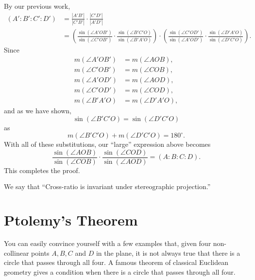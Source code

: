 \documentclass{ximera}
\begin{document}
\begin{problem}
\begin{freeResponse}
By our previous work, 
\begin{align*}
(A':B':C':D') &=\frac{|A'B'|}{|C'B'|}\cdot\frac{|C'D'|}{|A'D'|}\\
&=\left(\frac{\sin(\angle A'OB')}{\sin(\angle C'OB')}\cdot 
\frac{
\sin(\angle B'C'O)
}{
\sin(\angle B'A'O)
}\right) 
\cdot\left(\frac{
\sin(\angle C'OD')
}{
\sin(\angle A'OD')
}\cdot\frac{\sin(\angle D'A'O)}{\sin(\angle D'C'O)}\right).
\end{align*}
Since 
\begin{align*}
m(\angle A'OB') &= m(\angle AOB),\\
m(\angle C'OB') &= m(\angle COB),\\
m(\angle A'OD') &= m(\angle AOD),\\
m(\angle C'OD') &= m(\angle COD),\\
m(\angle B'A'O) &= m(\angle D'A'O),
\end{align*}
and as we have shown, 
\[
\sin(\angle B'C'O) = \sin(\angle D'C'O)
\]
as 
\[
m(\angle B'C'O) + m(\angle D'C'O) = 180^\circ.
\]
With all of these substitutions, our ``large'' expression above becomes
\[
\frac{\sin(\angle AOB)}{\sin(\angle COB)} \cdot\frac{
\sin(\angle COD)
}{
\sin(\angle AOD)
} = (A:B:C:D). 
\]
This completes the proof. 
\end{freeResponse}
\end{problem}


We say that ``Cross-ratio is invariant under stereographic
projection.''







\section{Ptolemy's Theorem}

You can easily convince yourself with a few examples that, given four
non-collinear points $A,B,C$ and $D$ in the plane, it is not always
true that there is a circle that passes through all four. A famous
theorem of classical Euclidean geometry gives a condition when there
is a circle that passes through all four.
\end{document}
